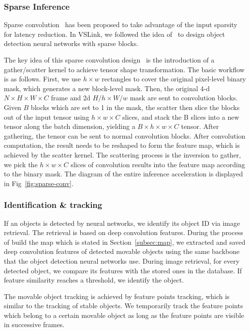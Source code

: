  
\subsubsection{\textbf{Sparse Inference}}
Sparse convolution~\cite{graham2015sparse, ren2018sbnet} has been  proposed to take advantage of the input sparsity for latency reduction.
In VSLink, we followed the idea of~\cite{ren2018sbnet} to design object detection neural networks with sparse blocks.

The key idea of this sparse convolution design~\cite{ren2018sbnet} is the introduction of a gather/scatter kernel to achieve tensor shape transformation.
The basic workflow is as follows. 
First, we use $h\times w$ rectangles to cover the original pixel-level binary mask, which generates a new block-level mask.
Then, the original 4-d $N \times H \times W \times C$ frame and 2d $H/h \times W/w$ mask are sent to convolution blocks. Given $B$ blocks which are set to 1 in the mask, the scatter then slice the blocks out of the input tensor using $h\times w \times C$ slices,  and stack the B slices into a new tensor
along the batch dimension, yielding a $B\times h \times w \times C$ tensor. After gathering, the tensor can be sent to normal  convolution blocks.
After convolution computation, the result needs to be reshaped to form the feature map, which is achieved by the scatter kernel. 
The scattering process is the inversion to gather, we pick the $h\times w \times C$ slices of convolution results into the feature map according to the binary mask. The diagram of the entire inference acceleration is displayed in Fig~\ref{fig:sparse-conv}.



\subsubsection{\textbf{Identification \& tracking}}
If an objects is detected by neural networks, we identify its object ID via image retrieval. The retrieval is based on deep convolution features.
During the process of build the map which is stated in Section~\ref{subsec:map}, we extracted and saved deep convolution features of detected movable objects using the same backbone that the object detection neural networks use. 
During image retrieval, for every detected object, we compare its features with the stored ones in the database. If feature similarity reaches a threshold, we identify the object.

The movable object tracking is achieved by feature points tracking, which is similar to the tracking of stable objects.
We temporarily track the feature points which belong to a certain movable object as long as the feature points are visible in successive frames. 


